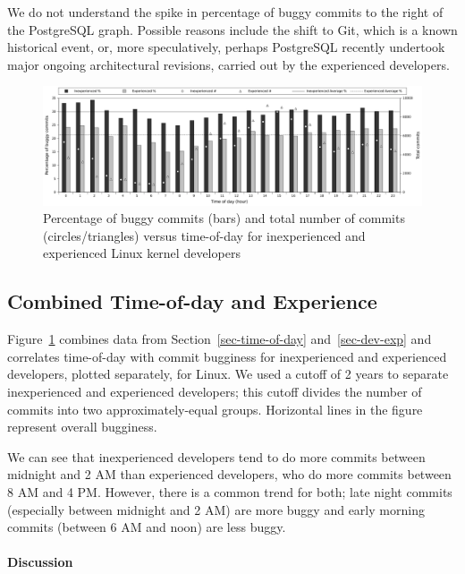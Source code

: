 We do not understand the spike in percentage of buggy commits to the
right of the PostgreSQL graph. Possible reasons include the shift to
Git, which is a known historical event, or, more speculatively,
perhaps PostgreSQL recently undertook major ongoing architectural
revisions, carried out by the experienced developers.

\begin{figure}[tbh]
\includegraphics[width=\textwidth]{linux-bugginess-hour-experienced.pdf}
\caption{\label{fig-linux-bugginess-experienced}Percentage of buggy commits
 (bars) and total number of commits (circles/triangles) versus time-of-day for
 inexperienced and experienced Linux kernel developers}
\end{figure}

\subsection{Combined Time-of-day and Experience}
\label{sec:toddev-exp}

Figure~\ref{fig-linux-bugginess-experienced} combines data from
Section~\ref{sec-time-of-day} and~\ref{sec-dev-exp} and correlates time-of-day
with commit bugginess for inexperienced and experienced developers,
plotted separately, for Linux. We used
a cutoff of 2 years to separate inexperienced and experienced developers; 
this cutoff divides the number of commits into two approximately-equal groups. 
Horizontal lines in the figure represent overall
bugginess. 

We can see that inexperienced developers tend to do more commits between
midnight and 2 AM than experienced developers, who do more commits between 8 AM
and 4 PM. However, there is a common trend for both; late night commits
(especially between midnight and 2 AM) are more buggy and early morning commits
(between 6 AM and noon) are less buggy.

\paragraph{Discussion}

